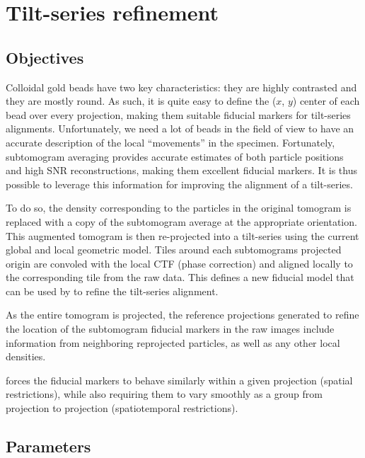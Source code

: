 \section{Tilt-series refinement} \label{sec:tomoCPR}

\subsection{Objectives}

Colloidal gold beads have two key characteristics: they are highly contrasted and they are mostly round. As such, it is quite easy to define the ($x$, $y$) center of each bead over every projection, making them suitable fiducial markers for tilt-series alignments. Unfortunately, we need a lot of beads in the field of view to have an accurate description of the local ``movements'' in the specimen. Fortunately, subtomogram averaging provides accurate estimates of both particle positions and high SNR reconstructions, making them excellent fiducial markers. It is thus possible to leverage this information for improving the alignment of a tilt-series.

To do so, the density corresponding to the particles in the original tomogram is replaced with a copy of the subtomogram average at the appropriate orientation. This augmented tomogram is then re-projected into a tilt-series using the current global and local geometric model. Tiles around each subtomograms projected origin are convoled with the local CTF (phase correction) and aligned locally to the corresponding tile from the raw data. This defines a new fiducial model that can be used by {\tiltalign} to refine the tilt-series alignment.

\begin{note}As the entire tomogram is projected, the reference projections generated to refine the location of the subtomogram fiducial markers in the raw images include information from neighboring reprojected particles, as well as any other local densities.
\end{note}
    
\begin{note}{\tiltalign} forces the fiducial markers to behave similarly within a given projection (spatial restrictions), while also requiring them to vary smoothly as a group from projection to projection (spatiotemporal restrictions).
\end{note}


\subsection{Parameters}

